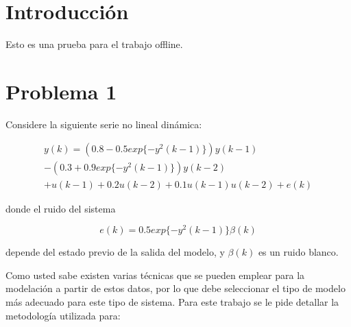 \documentclass[12pt]{article}
\begin{document}

\tableofcontents

\thispagestyle{empty}
\pagebreak
\newpage
\setcounter{page}{1}


\section{Introducción}

Esto es una prueba para el trabajo offline.


\section{Problema 1}

Considere la siguiente serie no lineal dinámica:

\begin{align}
y(k)= (0.8 - 0.5 exp\{-y^2(k- 1)\})y(k - 1)\nonumber \\
-(0.3 + 0.9 exp\{-y^2(k - 1)\})y(k - 2)\nonumber \\
+u(k - 1) + 0.2u(k - 2) + 0.1u(k - 1)u(k - 2) + e(k)
\label{e_serie}
\end{align}

donde el ruido del sistema

\begin{equation}
e(k)=  0.5 exp\{-y^2(k- 1)\}\beta(k)
\label{e_error}
\end{equation}

depende del estado previo de la salida del modelo, y $\beta(k)$ es un ruido blanco.

Como usted sabe existen varias técnicas que se pueden emplear para la modelación a partir de estos datos, por lo que debe seleccionar el tipo de modelo más adecuado para este tipo de sistema. Para este trabajo se le pide detallar la metodología utilizada para:
\end{document}
